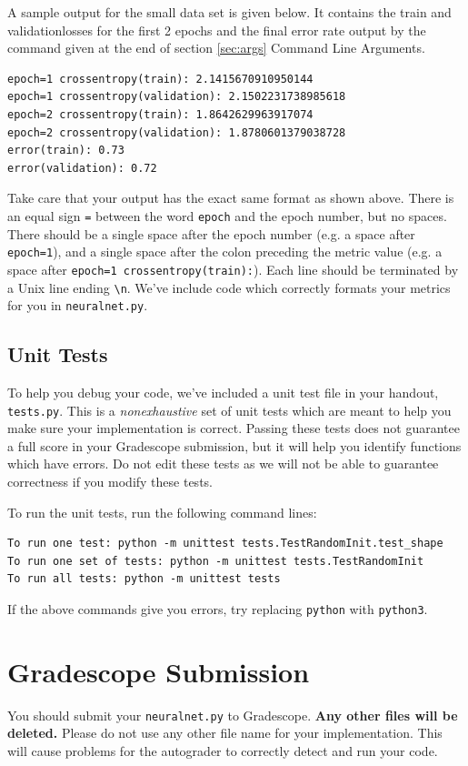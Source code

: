 \documentclass[11pt,addpoints,answers]{exam}
\begin{document}
A sample output for the small data set is given below. It contains the train and validation\thinspace losses for the first 2 epochs and the final error rate output by the command given at the end of section
\ref{sec:args} Command Line Arguments.

\begin{lstlisting}
epoch=1 crossentropy(train): 2.1415670910950144
epoch=1 crossentropy(validation): 2.1502231738985618
epoch=2 crossentropy(train): 1.8642629963917074
epoch=2 crossentropy(validation): 1.8780601379038728
error(train): 0.73
error(validation): 0.72
\end{lstlisting}

Take care that your output has the exact same format as shown above. There is an equal sign \lstinline{=} between the word \lstinline{epoch} and the epoch number, but no spaces. There should be a single space after the epoch number (e.g. a space after \lstinline{epoch=1}), and a single space after the colon preceding the metric value (e.g. a space after \lstinline{epoch=1 crossentropy(train):}). Each line should be terminated by a Unix line ending \lstinline{\n}. We've include code which correctly formats your metrics for you in \texttt{neuralnet.py}.

\subsection{Unit Tests} \label{unittests}
To help you debug your code, we've included a unit test file in your handout, \texttt{tests.py}. This is a \emph{nonexhaustive} set of unit tests which are meant to help you make sure your implementation is correct. Passing these tests does not guarantee a full score in your Gradescope submission, but it will help you identify functions which have errors. Do not edit these tests as we will not be able to guarantee correctness if you modify these tests.

To run the unit tests, run the following command lines:
\begin{lstlisting}[language=Shell]
To run one test: python -m unittest tests.TestRandomInit.test_shape
To run one set of tests: python -m unittest tests.TestRandomInit
To run all tests: python -m unittest tests
\end{lstlisting}

If the above commands give you errors, try replacing \texttt{python} with \texttt{python3}.

\section{Gradescope Submission}
You should submit your \texttt{neuralnet.py} to Gradescope. \textbf{Any other files will be deleted.} Please do not use any other file name for your implementation. This will cause problems for the autograder to correctly detect and run your code.
\end{document}
